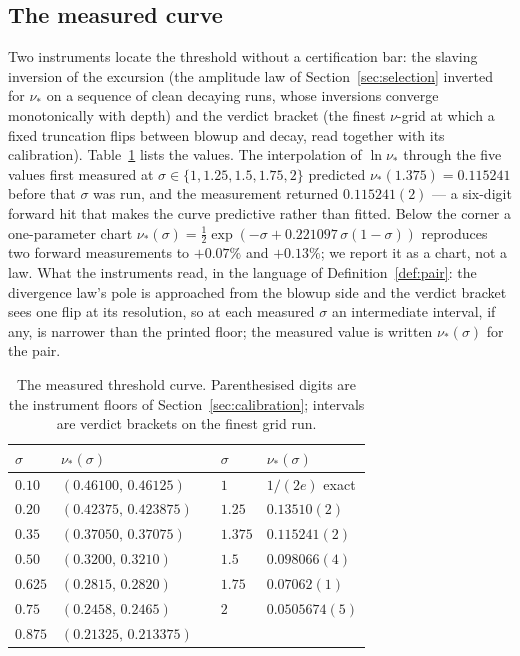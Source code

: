 \documentclass[11pt,a4paper]{article}
\theoremstyle{plain}
\theoremstyle{definition}
\begin{document}
\subsection{The measured curve}
Two instruments locate the threshold without a certification bar: the slaving inversion of the excursion (the amplitude law of Section~\ref{sec:selection} inverted for $\nu_*$ on a sequence of clean decaying runs, whose inversions converge monotonically with depth) and the verdict bracket (the finest $\nu$-grid at which a fixed truncation flips between blowup and decay, read together with its calibration). Table~\ref{tab:map} lists the values. The interpolation of $\ln\nu_*$ through the five values first measured at $\sigma\in\{1,1.25,1.5,1.75,2\}$ predicted $\nu_*(1.375)=0.115241$ before that $\sigma$ was run, and the measurement returned $0.115241(2)$ --- a six-digit forward hit that makes the curve predictive rather than fitted. Below the corner a one-parameter chart $\nu_*(\sigma)=\tfrac12\exp(-\sigma+0.221097\,\sigma(1-\sigma))$ reproduces two forward measurements to $+0.07\%$ and $+0.13\%$; we report it as a chart, not a law. What the instruments read, in the language of Definition~\ref{def:pair}: the divergence law's pole is approached from the blowup side and the verdict bracket sees one flip at its resolution, so at each measured $\sigma$ an intermediate interval, if any, is narrower than the printed floor; the measured value is written $\nu_*(\sigma)$ for the pair.

\begin{table}[htbp]
\centering\small
\caption{The measured threshold curve. Parenthesised digits are the instrument floors of Section~\ref{sec:calibration}; intervals are verdict brackets on the finest grid run.}\label{tab:map}
\begin{tabular}{@{}lllll@{}}
\toprule
$\sigma$ & $\nu_*(\sigma)$ & & $\sigma$ & $\nu_*(\sigma)$\\
\midrule
$0.10$ & $(0.46100,\,0.46125)$ & & $1$ & $1/(2e)$ exact\\
$0.20$ & $(0.42375,\,0.423875)$ & & $1.25$ & $0.13510(2)$\\
$0.35$ & $(0.37050,\,0.37075)$ & & $1.375$ & $0.115241(2)$\\
$0.50$ & $(0.3200,\,0.3210)$ & & $1.5$ & $0.098066(4)$\\
$0.625$ & $(0.2815,\,0.2820)$ & & $1.75$ & $0.07062(1)$\\
$0.75$ & $(0.2458,\,0.2465)$ & & $2$ & $0.0505674(5)$\\
$0.875$ & $(0.21325,\,0.213375)$ & & & \\
\bottomrule
\end{tabular}
\end{table}
\end{document}
